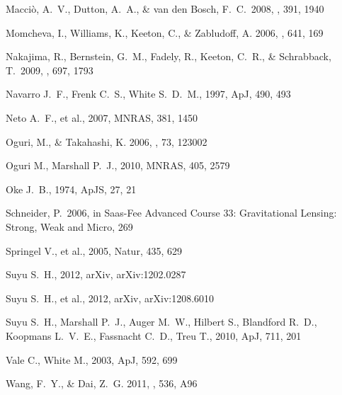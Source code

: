\begin{thebibliography}{99}
 Macci{\`o}, A.~V., 
Dutton, A.~A., \& van den Bosch, F.~C.\ 2008, \mnras, 391, 1940 



{Momcheva}, I., {Williams}, K., {Keeton}, C., \& {Zabludoff}, A. 2006, \apj,
  641, 169

 Nakajima, R., 
Bernstein, G.~M., Fadely, R., Keeton, C.~R., 
\& Schrabback, T.\ 2009, \apj, 697, 1793 

 Navarro J.~F., Frenk C.~S., White S.~D.~M., 1997, ApJ, 490, 493 


Neto A.~F., et al., 2007, MNRAS, 381, 1450 


{Oguri}, M., \& {Takahashi}, K. 2006, \prd, 73, 123002

 Oguri M., Marshall P.~J., 2010, MNRAS, 405, 2579 


 Oke 
J.~B., 1974, ApJS, 27, 21 

 Schneider, P.\ 2006, 
in Saas-Fee Advanced Course 33: Gravitational Lensing: Strong, Weak and Micro, 
269 

 Springel V., et al., 2005, Natur, 435, 629 


 Suyu 
S.~H., 2012, arXiv, arXiv:1202.0287 


Suyu S.~H., et al., 2012, arXiv, arXiv:1208.6010 


Suyu S.~H., Marshall P.~J., Auger M.~W., Hilbert S., Blandford R.~D., 
Koopmans L.~V.~E., Fassnacht C.~D., Treu T., 2010, ApJ, 711, 201 


 Vale C., White M., 2003, ApJ, 592, 699 


{Wang}, F.~Y., \& {Dai}, Z.~G. 2011, \aap, 536, A96



\end{thebibliography}
